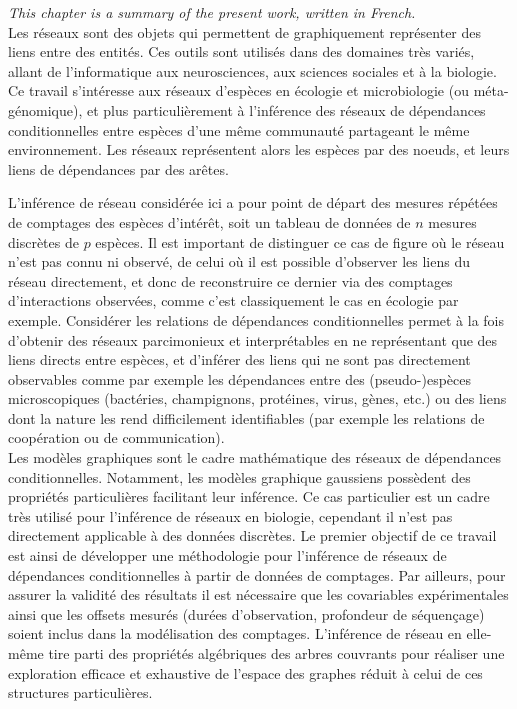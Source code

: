 \textit{This chapter is a summary of the present work, written in French.}\\

Les réseaux sont des objets qui permettent de graphiquement représenter des liens entre des entités.  Ces outils sont utilisés dans des domaines très variés, allant de l'informatique aux neurosciences, aux sciences sociales et à la biologie. Ce travail s'intéresse aux réseaux d'espèces en écologie et microbiologie (ou méta-génomique), et plus particulièrement à l'inférence des réseaux de dépendances conditionnelles entre espèces d'une même communauté partageant le même environnement. Les réseaux représentent alors les espèces par des noeuds, et leurs liens de dépendances par des arêtes.

 L'inférence de réseau considérée ici a pour point de départ des mesures répétées de comptages des espèces d'intérêt, soit un tableau de données de $n$ mesures discrètes de $p$ espèces. Il est important de distinguer ce cas de figure où le réseau n'est pas connu ni observé, de celui où il est possible d'observer les liens du réseau directement, et donc de reconstruire ce dernier via des comptages d'interactions observées, comme c'est classiquement le cas en écologie par exemple. Considérer les relations de dépendances conditionnelles permet à la fois d'obtenir des réseaux parcimonieux et interprétables en ne représentant que des liens directs entre espèces, et d'inférer des liens qui ne sont pas directement observables comme par exemple les dépendances entre des (pseudo-)espèces microscopiques (bactéries, champignons, protéines, virus, gènes, etc.) ou des liens dont la nature les rend difficilement identifiables (par exemple les relations de coopération ou de communication). \\

Les modèles graphiques sont le cadre mathématique des réseaux de dépendances conditionnelles.  Notamment, les modèles graphique gaussiens possèdent des propriétés particulières facilitant leur inférence. Ce cas particulier est un cadre très utilisé pour l'inférence de réseaux en biologie, cependant il n'est pas directement applicable à des données discrètes.  Le premier objectif de ce travail est ainsi de développer une méthodologie pour l'inférence de réseaux de dépendances conditionnelles à partir de données de comptages. Par ailleurs, pour assurer la validité des résultats il est nécessaire que les covariables expérimentales ainsi que les offsets mesurés (durées d'observation, profondeur de séquençage) soient inclus dans la modélisation des comptages. L'inférence de réseau en elle-même tire parti des propriétés algébriques des arbres couvrants pour réaliser une exploration efficace et exhaustive de l'espace des graphes réduit à celui de ces structures particulières.


